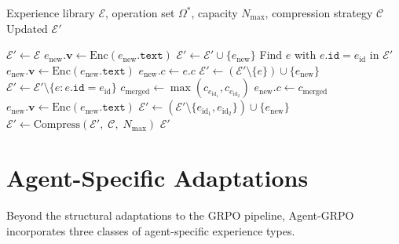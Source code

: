 \documentclass[11pt]{article}
\begin{document}
\begin{algorithm}[H]
\caption{SemanticMemoryManager.Update}
\label{alg:memory-update}
\begin{algorithmic}[1]
\Require Experience library $\mathcal{E}$, operation set $\Omega^*$,
         capacity $N_{\max}$, compression strategy $\mathcal{C}$
\Ensure Updated $\mathcal{E}'$

\State $\mathcal{E}' \gets \mathcal{E}$
        \State $e_{\text{new}}.\bm{v} \gets \text{Enc}(e_{\text{new}}.\texttt{text})$
        \State $\mathcal{E}' \gets \mathcal{E}' \cup \{e_{\text{new}}\}$
        \State Find $e$ with $e.\texttt{id} = e_{\text{id}}$ in $\mathcal{E}'$
        \State $e_{\text{new}}.\bm{v} \gets \text{Enc}(e_{\text{new}}.\texttt{text})$
        \State $e_{\text{new}}.c \gets e.c$ 
        \State $\mathcal{E}' \gets (\mathcal{E}' \setminus \{e\}) \cup \{e_{\text{new}}\}$
        \State $\mathcal{E}' \gets \mathcal{E}' \setminus \{e : e.\texttt{id} = e_{\text{id}}\}$
        \State $c_{\text{merged}} \gets \max(c_{e_{\text{id}_1}}, c_{e_{\text{id}_2}})$
        \State $e_{\text{new}}.c \gets c_{\text{merged}}$
        \State $e_{\text{new}}.\bm{v} \gets \text{Enc}(e_{\text{new}}.\texttt{text})$
        \State $\mathcal{E}' \gets (\mathcal{E}' \setminus \{e_{\text{id}_1}, e_{\text{id}_2}\}) \cup \{e_{\text{new}}\}$
    \EndIf
\EndFor
{}
    \State $\mathcal{E}' \gets \text{Compress}(\mathcal{E}',\; \mathcal{C},\; N_{\max})$
\EndIf
\State \Return $\mathcal{E}'$
\end{algorithmic}
\end{algorithm}

\section{Agent-Specific Adaptations}
\label{sec:adaptations}

Beyond the structural adaptations to the GRPO pipeline, Agent-GRPO incorporates
three classes of agent-specific experience types.
\end{document}
